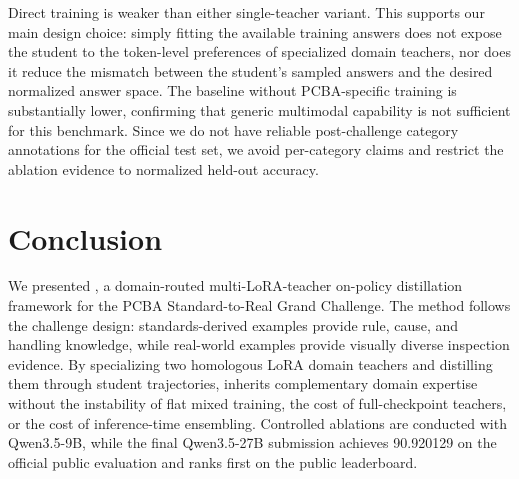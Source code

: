 \documentclass[sigconf, screen, review, anonymous]{acmart}
\begin{document}
Direct training is weaker than either single-teacher variant. This supports our main design choice: simply fitting the available training answers does not expose the student to the token-level preferences of specialized domain teachers, nor does it reduce the mismatch between the student's sampled answers and the desired normalized answer space. The baseline without PCBA-specific training is substantially lower, confirming that generic multimodal capability is not sufficient for this benchmark. Since we do not have reliable post-challenge category annotations for the official test set, we avoid per-category claims and restrict the ablation evidence to normalized held-out accuracy.

\section{Conclusion}
\label{sec:conclusion}

We presented \method, a domain-routed multi-LoRA-teacher on-policy distillation framework for the PCBA Standard-to-Real Grand Challenge. The method follows the challenge design: standards-derived examples provide rule, cause, and handling knowledge, while real-world examples provide visually diverse inspection evidence. By specializing two homologous LoRA domain teachers and distilling them through student trajectories, \method{} inherits complementary domain expertise without the instability of flat mixed training, the cost of full-checkpoint teachers, or the cost of inference-time ensembling. Controlled ablations are conducted with Qwen3.5-9B, while the final Qwen3.5-27B submission achieves 90.920129 on the official public evaluation and ranks first on the public leaderboard.



\end{document}
